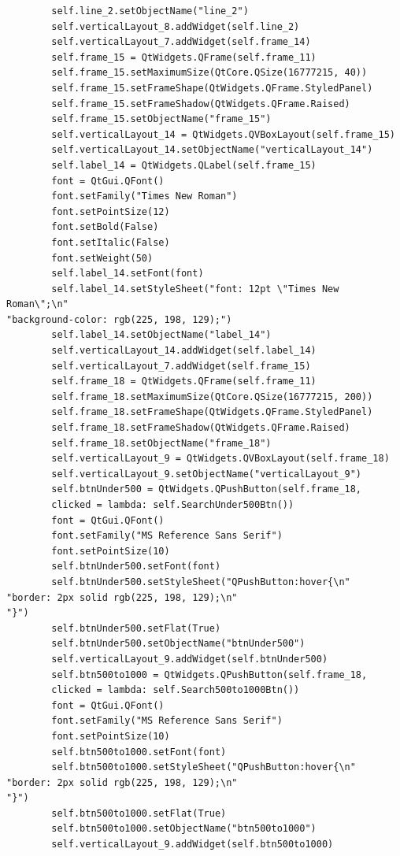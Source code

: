 \documentclass[12pt]{article}
\begin{document}
\begin{verbatim}
        self.line_2.setObjectName("line_2")
        self.verticalLayout_8.addWidget(self.line_2)
        self.verticalLayout_7.addWidget(self.frame_14)
        self.frame_15 = QtWidgets.QFrame(self.frame_11)
        self.frame_15.setMaximumSize(QtCore.QSize(16777215, 40))
        self.frame_15.setFrameShape(QtWidgets.QFrame.StyledPanel)
        self.frame_15.setFrameShadow(QtWidgets.QFrame.Raised)
        self.frame_15.setObjectName("frame_15")
        self.verticalLayout_14 = QtWidgets.QVBoxLayout(self.frame_15)
        self.verticalLayout_14.setObjectName("verticalLayout_14")
        self.label_14 = QtWidgets.QLabel(self.frame_15)
        font = QtGui.QFont()
        font.setFamily("Times New Roman")
        font.setPointSize(12)
        font.setBold(False)
        font.setItalic(False)
        font.setWeight(50)
        self.label_14.setFont(font)
        self.label_14.setStyleSheet("font: 12pt \"Times New Roman\";\n"
"background-color: rgb(225, 198, 129);")
        self.label_14.setObjectName("label_14")
        self.verticalLayout_14.addWidget(self.label_14)
        self.verticalLayout_7.addWidget(self.frame_15)
        self.frame_18 = QtWidgets.QFrame(self.frame_11)
        self.frame_18.setMaximumSize(QtCore.QSize(16777215, 200))
        self.frame_18.setFrameShape(QtWidgets.QFrame.StyledPanel)
        self.frame_18.setFrameShadow(QtWidgets.QFrame.Raised)
        self.frame_18.setObjectName("frame_18")
        self.verticalLayout_9 = QtWidgets.QVBoxLayout(self.frame_18)
        self.verticalLayout_9.setObjectName("verticalLayout_9")
        self.btnUnder500 = QtWidgets.QPushButton(self.frame_18, 
        clicked = lambda: self.SearchUnder500Btn())
        font = QtGui.QFont()
        font.setFamily("MS Reference Sans Serif")
        font.setPointSize(10)
        self.btnUnder500.setFont(font)
        self.btnUnder500.setStyleSheet("QPushButton:hover{\n"
"border: 2px solid rgb(225, 198, 129);\n"
"}")
        self.btnUnder500.setFlat(True)
        self.btnUnder500.setObjectName("btnUnder500")
        self.verticalLayout_9.addWidget(self.btnUnder500)
        self.btn500to1000 = QtWidgets.QPushButton(self.frame_18, 
        clicked = lambda: self.Search500to1000Btn())
        font = QtGui.QFont()
        font.setFamily("MS Reference Sans Serif")
        font.setPointSize(10)
        self.btn500to1000.setFont(font)
        self.btn500to1000.setStyleSheet("QPushButton:hover{\n"
"border: 2px solid rgb(225, 198, 129);\n"
"}")
        self.btn500to1000.setFlat(True)
        self.btn500to1000.setObjectName("btn500to1000")
        self.verticalLayout_9.addWidget(self.btn500to1000)

\end{verbatim}
\end{document}
